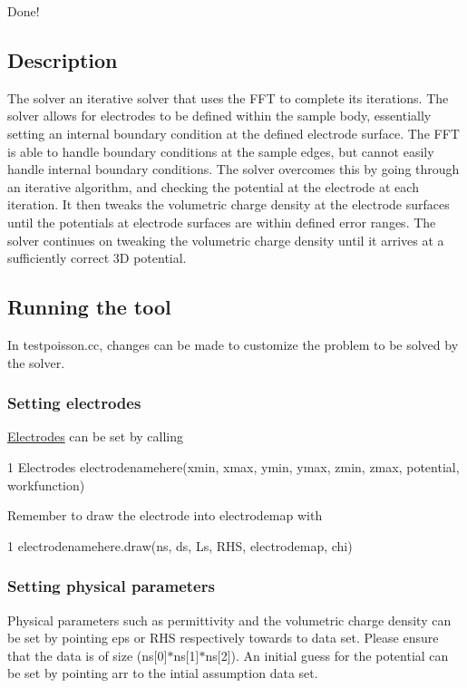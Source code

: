 Done!

\subsection*{Description}

The solver an iterative solver that uses the F\+FT to complete its iterations. The solver allows for electrodes to be defined within the sample body, essentially setting an internal boundary condition at the defined electrode surface. The F\+FT is able to handle boundary conditions at the sample edges, but cannot easily handle internal boundary conditions. The solver overcomes this by going through an iterative algorithm, and checking the potential at the electrode at each iteration. It then tweaks the volumetric charge density at the electrode surfaces until the potentials at electrode surfaces are within defined error ranges. The solver continues on tweaking the volumetric charge density until it arrives at a sufficiently correct 3D potential.

\subsection*{Running the tool}

In testpoisson.\+cc, changes can be made to customize the problem to be solved by the solver.

\subsubsection*{Setting electrodes}

\hyperlink{classElectrodes}{Electrodes} can be set by calling


\begin{DoxyCode}
1 Electrodes electrodenamehere(xmin, xmax, ymin, ymax, zmin, zmax, potential, workfunction)
\end{DoxyCode}


Remember to draw the electrode into electrodemap with


\begin{DoxyCode}
1 electrodenamehere.draw(ns, ds, Ls, RHS, electrodemap, chi)
\end{DoxyCode}


\subsubsection*{Setting physical parameters}

Physical parameters such as permittivity and the volumetric charge density can be set by pointing eps or R\+HS respectively towards to data set. Please ensure that the data is of size (ns\mbox{[}0\mbox{]}$\ast$ns\mbox{[}1\mbox{]}$\ast$ns\mbox{[}2\mbox{]}). An initial guess for the potential can be set by pointing arr to the intial assumption data set.

